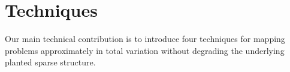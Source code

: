 
\section{Techniques}

Our main technical contribution is to introduce four techniques for mapping problems approximately in total variation without degrading the underlying planted sparse structure.

